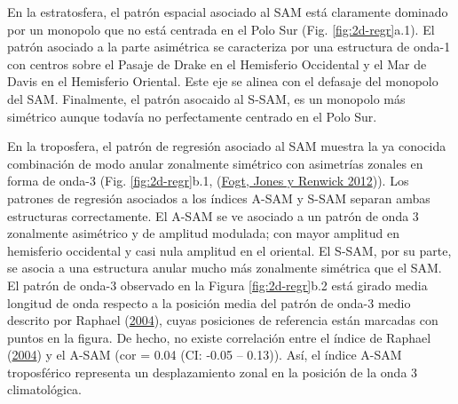\documentclass[12pt,oneside,a4paper]{reedthesis}
\begin{document}
En la estratosfera, el patrón espacial asociado al SAM está claramente dominado por un monopolo que no está centrada en el Polo Sur (Fig. \ref{fig:2d-regr}a.1).
El patrón asociado a la parte asimétrica se caracteriza por una estructura de onda-1 con centros sobre el Pasaje de Drake en el Hemisferio Occidental y el Mar de Davis en el Hemisferio Oriental.
Este eje se alinea con el defasaje del monopolo del SAM.
Finalmente, el patrón asocaido al S-SAM, es un monopolo más simétrico aunque todavía no perfectamente centrado en el Polo Sur.

En la troposfera, el patrón de regresión asociado al SAM muestra la ya conocida combinación de modo anular zonalmente simétrico con asimetrías zonales en forma de onda-3 (Fig. \ref{fig:2d-regr}b.1, (\protect\hyperlink{ref-fogt2012}{Fogt, Jones y Renwick 2012})).
Los patrones de regresión asociados a los índices A-SAM y S-SAM separan ambas estructuras correctamente.
El A-SAM se ve asociado a un patrón de onda 3 zonalmente asimétrico y de amplitud modulada; con mayor amplitud en hemisferio occidental y casi nula amplitud en el oriental.
El S-SAM, por su parte, se asocia a una estructura anular mucho más zonalmente simétrica que el SAM.
El patrón de onda-3 observado en la Figura \ref{fig:2d-regr}b.2 está girado media longitud de onda respecto a la posición media del patrón de onda-3 medio descrito por Raphael (\protect\hyperlink{ref-raphael2004}{2004}), cuyas posiciones de referencia están marcadas con puntos en la figura.
De hecho, no existe correlación entre el índice de Raphael (\protect\hyperlink{ref-raphael2004}{2004}) y el A-SAM (cor = 0.04 (CI: -0.05 -- 0.13)).
Así, el índice A-SAM troposférico representa un desplazamiento zonal en la posición de la onda 3 climatológica.
\end{document}

